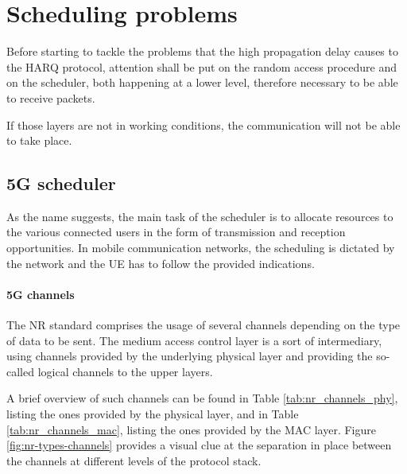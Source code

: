 
\chapter{Scheduling problems}
\label{chp:scheduling_problems}

Before starting to tackle the problems that the high propagation delay causes to the \ac{HARQ} protocol, attention shall be put on the random access procedure and on the scheduler, both happening at a lower level, therefore necessary to be able to receive packets.

If those layers are not in working conditions, the communication will not be able to take place.

\section{5G scheduler}
As the name suggests, the main task of the scheduler is to allocate resources to the various connected users in the form of transmission and reception opportunities. In mobile communication networks, the scheduling is dictated by the network and the \ac{UE} has to follow the provided indications.

\subsubsection{5G channels}
The \ac{NR} standard comprises the usage of several channels depending on the type of data to be sent. The medium access control layer is a sort of intermediary, using channels provided by the underlying physical layer and providing the so-called logical channels to the upper layers.

A brief overview of such channels can be found in Table \ref{tab:nr_channels_phy}, listing the ones provided by the physical layer, and in Table \ref{tab:nr_channels_mac}, listing the ones provided by the \ac{MAC} layer. Figure \ref{fig:nr-types-channels} provides a visual clue at the separation in place between the channels at different levels of the protocol stack.

